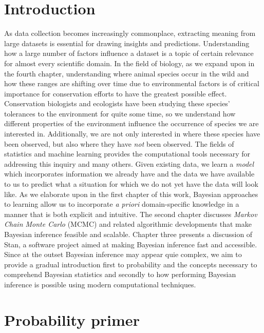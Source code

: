 \documentclass[
  12pt,
  oneside]{book}
\theoremstyle{definition}
\theoremstyle{definition}
\theoremstyle{definition}
\theoremstyle{remark}
\begin{document}
\hypertarget{introduction}{%
\chapter*{Introduction}\label{introduction}}

As data collection becomes increasingly commonplace, extracting meaning from large datasets is essential for drawing insights and predictions.
Understanding how a large number of factors influence a dataset is a topic of certain relevance for almost every scientific domain.
In the field of biology, as we expand upon in the fourth chapter, understanding where animal species occur in the wild and how these ranges are shifting over time due to environmental factors is of critical importance for conservation efforts to have the greatest possible effect.
Conservation biologists and ecologists have been studying these species' tolerances to the environment for quite some time, so we understand how different properties of the environment influence the occurrence of species we are interested in.
Additionally, we are not only interested in where these species have been observed, but also where they have \emph{not} been observed.
The fields of statistics and machine learning provides the computational tools necessary for addressing this inquiry and many others.
Given existing data, we learn a \emph{model} which incorporates information we already have and the data we have available to us to predict what a situation for which we do not yet have the data will look like.
As we elaborate upon in the first chapter of this work, Bayesian approaches to learning allow us to incorporate \emph{a priori} domain-specific knowledge in a manner that is both explicit and intuitive.
The second chapter discusses \emph{Markov Chain Monte Carlo} (MCMC) and related algorithmic developments that make Bayesian inference feasible and scalable.
Chapter three presents a discussion of Stan, a software project aimed at making Bayesian inference fast and accessible.
Since at the outset Bayesian inference may appear quie complex, we aim to provide a gradual introduction first to probability and the concepts necessary to comprehend Bayesian statistics and secondly to how performing Bayesian inference is possible using modern computational techniques.

\hypertarget{probability-primer}{%
\chapter{Probability primer}\label{probability-primer}}
\end{document}
